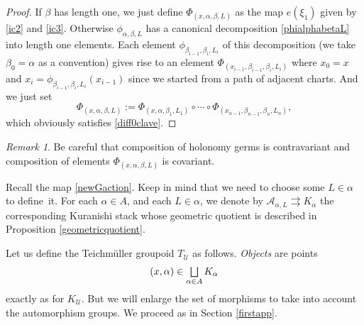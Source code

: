\documentclass[10pt]{amsart}
\let\mathcal\mathscr
\let\oldbigsqcup\bigsqcup
\renewcommand{\bigsqcup}{\mathop{\textstyle\oldbigsqcup}\displaylimits}
\theoremstyle{plain}
\theoremstyle{definition}
\theoremstyle{remark}
\newtheorem{remark}[theorem]{Remark}
\numberwithin{equation}{section}
\let\uniondisjointe\bigsqcup
\begin{document}
\begin{proof}
If $\beta$ has length one, we just define $\Phi_{(x,\alpha,\beta, L)}$ as the map $e(\xi_1)$ given by \eqref{ic2} and \eqref{ic3}. Otherwise $\phi_{\alpha,\beta, L}$ has a canonical decomposition
\eqref{phialphabetaL} into length one elements. Each element $\phi_{\beta_{i-1},\beta_i,L_i}$ of this decomposition (we take $\beta_0=\alpha$ as a convention) gives rise to an element $\Phi_{(x_{i-1},\beta_{i-1},\beta_i, L_i)}$ where $x_0=x$ and $x_i=\phi_{\beta_{i-1},\beta_i,L_i}(x_{i-1})$ since we started from a path of adjacent charts. And we just set
\begin{equation}
\label{Phi}
\Phi_{(x,\alpha,\beta, L)}:=\Phi_{(x,\alpha,\beta_1, L_1)}\circ\cdots\circ
\Phi_{(x_{n-1},\beta_{n-1},\beta_n, L_n)},
\end{equation}
which obviously satisfies \eqref{diff0clave}.
\end{proof}
\begin{remark}
\label{contravsco}
Be careful that composition of holonomy germs is contravariant and composition of elements $\Phi_{(x,\alpha,\beta, L)}$ is covariant.
\end{remark}

Recall the map \eqref{newGaction}. Keep in mind that we need to choose some $L\in\alpha$ to define~it.
For each $\alpha\in A$, and each $L\in\alpha$, we denote by $\mathcal A_{\alpha,L}\rightrightarrows K_\alpha$ the corresponding Kuranishi stack whose geometric quotient is described in Proposition \ref{geometricquotient}.

Let us define the Teichmüller groupoid $T_{\mathcal U}$ as follows. \emph{Objects} are points
\begin{equation}
\label{objectsteich}
(x,\alpha)\in\uniondisjointe_{\alpha\in A}K_{\alpha}
\end{equation}
exactly as for $K_{\mathcal U}$. But we will enlarge the set of morphisms to take into account the automorphism groups. We proceed as in Section \ref{firstapp}.
\end{document}
